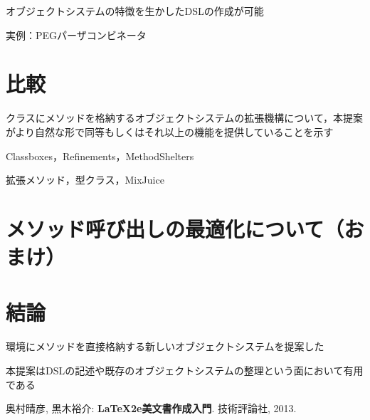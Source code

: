 \documentclass{ipsjprosym}
\begin{document}
オブジェクトシステムの特徴を生かしたDSLの作成が可能

実例：PEGパーザコンビネータ

\section{比較}

クラスにメソッドを格納するオブジェクトシステムの拡張機構について，本提案がより自然な形で同等もしくはそれ以上の機能を提供していることを示す

Classboxes，Refinements，MethodShelters

拡張メソッド，型クラス，MixJuice

\section{メソッド呼び出しの最適化について（おまけ）}

\section{結論}

環境にメソッドを直接格納する新しいオブジェクトシステムを提案した

本提案はDSLの記述や既存のオブジェクトシステムの整理という面において有用である


% 
% 

\begin{thebibliography}{9}
  奥村晴彦, 黒木裕介: \textbf{LaTeX2e美文書作成入門}. 技術評論社, 2013.
\end{thebibliography}
\end{document}
